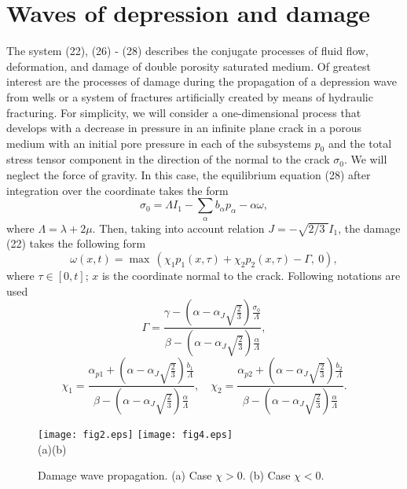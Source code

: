 \documentclass[article,authoryear,jpm]{beg_39}             %
\begin{document}
\section{Waves of depression and damage}
The system (22), (26) - (28) describes the conjugate processes of fluid flow, deformation, and damage of double porosity saturated medium. Of greatest interest are the processes of damage during the propagation of a depression wave from wells or a system of fractures artificially created by means of hydraulic fracturing. For simplicity, we will consider a one-dimensional process that develops with a decrease in pressure in an infinite plane crack in a porous medium with an initial pore pressure in each of the subsystems $p_0$ and the total stress tensor component in the direction of the normal to the crack $\sigma_0$. We will neglect the force of gravity. In this case, the equilibrium equation (28) after integration over the coordinate takes the form
\begin{equation}
{{\sigma }_{0}}=\Lambda {{I}_{1}}-\sum\limits_{\alpha }{{{b}_{\alpha }}{{p}_{\alpha }}-\alpha \omega },
\end{equation}
where $\Lambda =\lambda +2\mu$.
Then, taking into account relation $J=-\sqrt{{2}/{3}\;}{{I}_{1}}$, the damage (22) takes the following form
\begin{equation}
\omega (x,t)={\mathop{\max }}\,\left( {{\chi }_{1}}{{p}_{1}}(x,\tau )+{{\chi }_{2}}{{p}_{2}}(x,\tau )-\Gamma ,\ 0 \right),
\end{equation}
where $\tau \in [0,t]$; $x$ is the coordinate normal to the crack. Following notations are used
\begin{equation}
\Gamma =\frac{\gamma -\left( \alpha -{{\alpha }_{J}}\sqrt{\frac{2}{3}} \right)\frac{{{\sigma }_{0}}}{\Lambda }}{\beta -\left( \alpha -{{\alpha }_{J}}\sqrt{\frac{2}{3}} \right)\frac{\alpha }{\Lambda }},
\end{equation}
\begin{equation}
 {{\chi }_{1}}=\frac{{{\alpha }_{p1}}+\left( \alpha -{{\alpha }_{J}}\sqrt{\frac{2}{3}} \right)\frac{{{b}_{1}}}{\Lambda }}{\beta -\left( \alpha -{{\alpha }_{J}}\sqrt{\frac{2}{3}} \right)\frac{\alpha}{\Lambda }},\quad {{\chi}_{2}}=\frac{{{\alpha }_{p2}}+\left( \alpha -{{\alpha}_{J}}\sqrt{\frac{2}{3}} \right)\frac{{{b}_{2}}}{\Lambda }}{\beta -\left( \alpha -{{\alpha}_{J}}\sqrt{\frac{2}{3}} \right)\frac{\alpha }{\Lambda}}.
\end{equation}
\begin{figure}[!b]
	\centering
\texttt{[image: fig2.eps]} %
\texttt{[image: fig4.eps]} \\
  (a)\hspace*{220pt}(b)
\caption{Damage wave propagation. (a) Case $\chi>0$. (b)  Case $\chi<0$.}
\label{fig1}
\end{figure}
\end{document}
